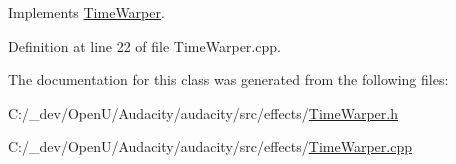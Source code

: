 Implements \hyperlink{class_time_warper_a23723ae122b6feed38614cdcc328a394}{Time\+Warper}.



Definition at line 22 of file Time\+Warper.\+cpp.



The documentation for this class was generated from the following files\+:\begin{DoxyCompactItemize}
\item 
C\+:/\+\_\+dev/\+Open\+U/\+Audacity/audacity/src/effects/\hyperlink{_time_warper_8h}{Time\+Warper.\+h}\item 
C\+:/\+\_\+dev/\+Open\+U/\+Audacity/audacity/src/effects/\hyperlink{_time_warper_8cpp}{Time\+Warper.\+cpp}\end{DoxyCompactItemize}
